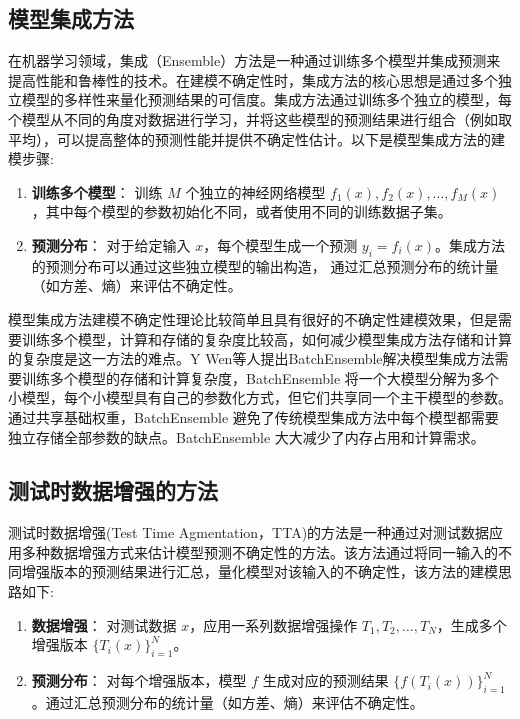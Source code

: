 \subsection{模型集成方法}
在机器学习领域，集成（Ensemble）方法\cite{lakshminarayanan2017simple}\cite{fort2019deep}是一种通过训练多个模型并集成预测来提高性能和鲁棒性的技术。在建模不确定性时，集成方法的核心思想是通过多个独立模型的多样性来量化预测结果的可信度。集成方法通过训练多个独立的模型，每个模型从不同的角度对数据进行学习，并将这些模型的预测结果进行组合（例如取平均），可以提高整体的预测性能并提供不确定性估计。以下是模型集成方法的建模步骤:


\begin{enumerate}
    \item \textbf{训练多个模型}：
    训练 \( M \) 个独立的神经网络模型 \( f_1(x), f_2(x), \ldots, f_M(x) \)，其中每个模型的参数初始化不同，或者使用不同的训练数据子集。

    \item \textbf{预测分布}：
    对于给定输入 \( x \)，每个模型生成一个预测 \( y_i = f_i(x) \)。集成方法的预测分布可以通过这些独立模型的输出构造， 通过汇总预测分布的统计量（如方差、熵）来评估不确定性。
\end{enumerate}

模型集成方法建模不确定性理论比较简单且具有很好的不确定性建模效果，但是需要训练多个模型，计算和存储的复杂度比较高，如何减少模型集成方法存储和计算的复杂度是这一方法的难点。Y Wen\cite{wen2020batchensemble}等人提出BatchEnsemble解决模型集成方法需要训练多个模型的存储和计算复杂度，BatchEnsemble 将一个大模型分解为多个小模型，每个小模型具有自己的参数化方式，但它们共享同一个主干模型的参数。通过共享基础权重，BatchEnsemble 避免了传统模型集成方法中每个模型都需要独立存储全部参数的缺点。BatchEnsemble 大大减少了内存占用和计算需求。




\subsection{测试时数据增强的方法}
测试时数据增强(Test Time Agmentation，TTA)的方法是一种通过对测试数据应用多种数据增强方式来估计模型预测不确定性的方法。该方法通过将同一输入的不同增强版本的预测结果进行汇总，量化模型对该输入的不确定性，该方法的建模思路如下:


\begin{enumerate}
    \item \textbf{数据增强}：
    对测试数据 \( x \)，应用一系列数据增强操作 \( T_1, T_2, \ldots, T_N \)，生成多个增强版本 \( \{ T_i(x) \}_{i=1}^N \)。

    \item \textbf{预测分布}：
    对每个增强版本，模型 \( f \) 生成对应的预测结果 \( \{ f(T_i(x)) \}_{i=1}^N \)。通过汇总预测分布的统计量（如方差、熵）来评估不确定性。
\end{enumerate}

